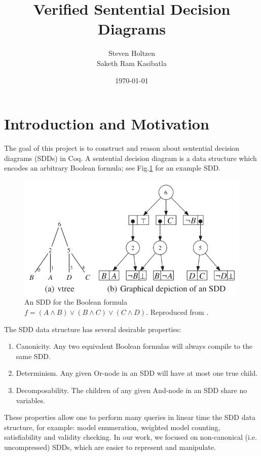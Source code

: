 \documentclass[twocolumn]{article}
\title{Verified Sentential Decision Diagrams}
\author{Steven Holtzen\\Saketh Ram Kasibatla}
\date{\today}
\theoremstyle{definition}
\begin{document}
\maketitle

\section{Introduction and Motivation}
The goal of this project is to construct and reason about sentential decision
diagrams (SDDs) in Coq. A sentential decision diagram is a data structure which encodes
an arbitrary Boolean formula; see Fig.\ref{fig:sdd} for an example SDD. 

\begin{figure}
  \includegraphics[width=\linewidth]{sdd.png}
  \caption{An SDD for the Boolean formula $f = (A \land B) \lor (B \land C) \lor
    (C \land D)$. Reproduced from \cite{Darwiche2011}.}
  \label{fig:sdd}
\end{figure}

The SDD data structure has several desirable properties:
\begin{enumerate}
\item Canonicity. Any two equivalent Boolean formulas will always compile to
  the same SDD.
\item Determinism. Any given Or-node in an SDD will have at most one true
  child.
\item Decomposability. The children of any given And-node in an SDD share
  no variables.
\end{enumerate} 
These properties allow one to perform many queries in linear time the SDD data
structure, for example: model enumeration, weighted model counting,
satisfiability and validity checking. In our work, we focused on non-canonical
(i.e. uncompressed) SDDs, which are easier to represent and manipulate.
\end{document}
